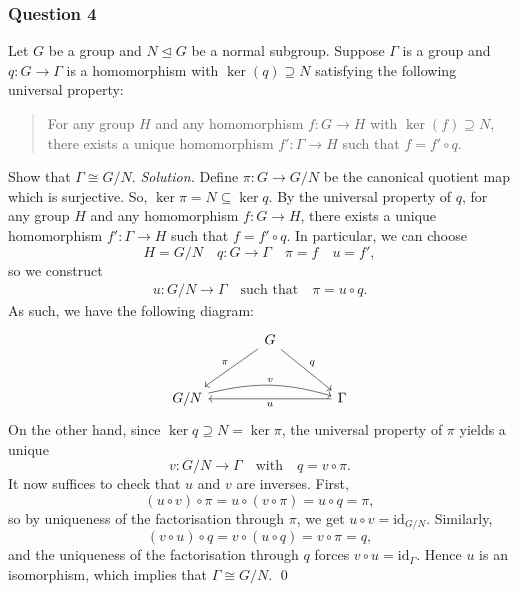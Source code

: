 \documentclass[12pt]{article}
\begin{document}
\subsubsection*{Question 4}
Let $G$ be a group and $N\unlhd G$ be a normal subgroup. Suppose $\Gamma$ is a group and $q:G\to\Gamma$ is a homomorphism with $\ker(q)\supseteq N$ satisfying the following universal property:
\begin{quote}
  For any group $H$ and any homomorphism $f:G\to H$ with $\ker(f)\supseteq N$, there exists a unique homomorphism $f':\Gamma\to H$ such that $f = f'\circ q$.
\end{quote}
Show that $\Gamma\cong G/N$.
\newline
\newline\textit{Solution.} Define $\pi:G\to G/N$ be the canonical quotient map which is surjective. So, $\operatorname{ker}\pi=N\subseteq \operatorname{ker}q$. By the universal property of \(q\), for any group $H$ and any homomorphism $f:G\to H$, there exists a unique homomorphism $f':\Gamma\to H$ such that $f=f'\circ q$. In particular, we can choose \[H=G/N\quad q:G\to \Gamma\quad \pi=f\quad u=f',\]
so we construct \begin{align*}
    u:G/N\to \Gamma\quad\text{such that}\quad \pi=u\circ q.
\end{align*}
As such, we have the following diagram:
\[
\begin{tikzcd}[row sep=large,column sep=large]
  & G \ar[dl,"\pi"'] \ar[dr,"q"] & \\
  G/N \ar[rr,bend left=15,"v"]   &              & \Gamma \ar[ll,"u"]
\end{tikzcd}
\]
On the other hand, since \(\ker q\supseteq N=\ker\pi\), the universal property of \(\pi\) yields a unique
\[
v: G/N\longrightarrow \Gamma\quad\text{with}\quad q=v\circ \pi.
\]
It now suffices to check that \(u\) and \(v\) are inverses.  First,
\[
(u\circ v)\circ\pi
=u\circ(v\circ\pi)
=u\circ q
=\pi,
\]
so by uniqueness of the factorisation through \(\pi\), we get \(u\circ v=\mathrm{id}_{G/N}\).  Similarly,
\[
(v\circ u)\circ q
=v\circ(u\circ q)
=v\circ\pi
=q,
\]
and the uniqueness of the factorisation through \(q\) forces \(v\circ u=\mathrm{id}_\Gamma\).  Hence \(u\) is an isomorphism, which implies that $\Gamma\cong G/N$. \qed 
\end{document}
